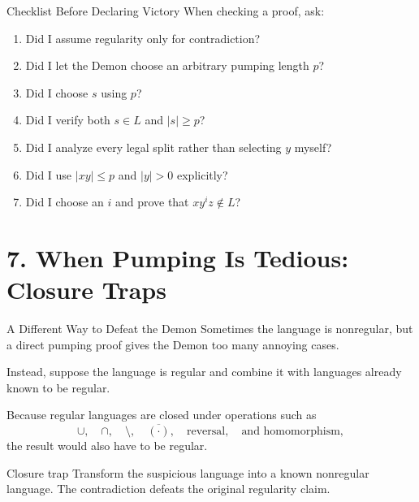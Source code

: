 \documentclass[10pt,aspectratio=169]{beamer}
\begin{document}
\begin{frame}{Checklist Before Declaring Victory}
When checking a proof, ask:

\begin{enumerate}
    \item Did I assume regularity only for contradiction?
    \item Did I let the Demon choose an arbitrary pumping length $p$?
    \item Did I choose $s$ using $p$?
    \item Did I verify both $s\in L$ and $|s|\geq p$?
    \item Did I analyze every legal split rather than selecting $y$ myself?
    \item Did I use $|xy|\leq p$ and $|y|>0$ explicitly?
    \item Did I choose an $i$ and prove that $xy^iz\notin L$?
\end{enumerate}
\end{frame}

\section{7. When Pumping Is Tedious: Closure Traps}

\begin{frame}{A Different Way to Defeat the Demon}
Sometimes the language is nonregular, but a direct pumping proof gives
the Demon too many annoying cases.

Instead, suppose the language is regular and combine it with languages
already known to be regular.

Because regular languages are closed under operations such as
\[
\cup,\quad \cap,\quad \setminus,\quad \overline{(\cdot)},\quad
\text{reversal},\quad\text{and homomorphism},
\]
the result would also have to be regular.

\begin{block}{Closure trap}
Transform the suspicious language into a known nonregular language.
The contradiction defeats the original regularity claim.
\end{block}
\end{frame}
\end{document}

